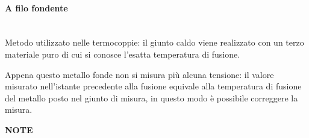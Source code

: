 \documentclass[a4paper, 15pt]{article}
\begin{document}
\begin{adjustwidth}{2in}{}
		\paragraph{A filo fondente} \mbox{} \\
		Metodo utilizzato nelle termocoppie: il giunto caldo viene realizzato con un terzo materiale puro di cui si conosce l'esatta temperatura di fusione. 
		
		Appena questo metallo fonde non si misura più alcuna tensione: il valore misurato nell’istante precedente alla fusione equivale alla temperatura di fusione del metallo posto nel giunto di misura, in questo modo è possibile correggere la misura.
	\end{adjustwidth}

	{\LARGE \textbf{NOTE}}
\end{document}
